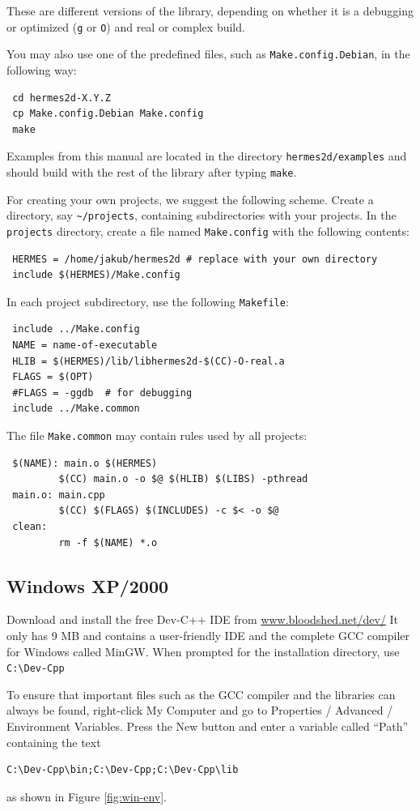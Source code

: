 These are different versions of the library, depending on whether it is a debugging
or optimized ({\tt g} or {\tt O}) and real or complex build. 

You may also use one of the predefined files, such as {\tt Make.config.Debian},
in the following way:
\begin{lstlisting}
 cd hermes2d-X.Y.Z
 cp Make.config.Debian Make.config
 make
\end{lstlisting}

Examples from this manual are located in the directory {\tt hermes2d/examples} and 
should build with the rest of the library after typing {\tt make}.

For creating your own projects, we suggest the following scheme. Create a directory,
say \verb"~/projects", containing subdirectories with your projects. In the
{\tt projects} directory, create a file named {\tt Make.config} with the following
contents:
\begin{lstlisting}
 HERMES = /home/jakub/hermes2d # replace with your own directory
 include $(HERMES)/Make.config
\end{lstlisting}
In each project subdirectory, use the following {\tt Makefile}:
\begin{lstlisting}
 include ../Make.config
 NAME = name-of-executable
 HLIB = $(HERMES)/lib/libhermes2d-$(CC)-O-real.a
 FLAGS = $(OPT)
 #FLAGS = -ggdb  # for debugging
 include ../Make.common
\end{lstlisting}
The file {\tt Make.common} may contain rules used by all projects:
\begin{lstlisting}
 $(NAME): main.o $(HERMES)
         $(CC) main.o -o $@ $(HLIB) $(LIBS) -pthread
 main.o: main.cpp
         $(CC) $(FLAGS) $(INCLUDES) -c $< -o $@
 clean:
         rm -f $(NAME) *.o
\end{lstlisting}



\subsection{Windows XP/2000}

Download and install the free Dev-C++ IDE from \url{www.bloodshed.net/dev/}
It only has 9 MB and contains a user-friendly IDE and the complete GCC compiler
for Windows called MinGW. When prompted for the installation directory,
use \verb"C:\Dev-Cpp"

To ensure that important files such as the GCC compiler and the libraries can
always be found, right-click My Computer and go to Properties / Advanced / Environment Variables.
Press the New button and enter a variable called ``Path'' containing the 
text
\begin{lstlisting}
C:\Dev-Cpp\bin;C:\Dev-Cpp;C:\Dev-Cpp\lib
\end{lstlisting}
as shown in Figure \ref{fig:win-env}. 

